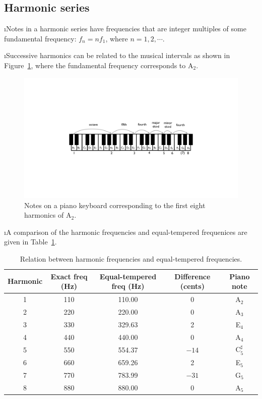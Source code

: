 \ei
\subsection{Harmonic series}
\bi

\i Notes in a harmonic series have frequencies that 
are integer multiples of some fundamental frequency:
$f_n= n f_1$, where $n=1,2,\cdots$.

\i Successive harmonics can be related to the musical 
intervals as shown in Figure~\ref{f:harmonics-keys},
where the fundamental frequency corresponds to A$_2$.
%
\begin{figure}[htbp]
\begin{center}
\includegraphics[width=\textwidth]{harmonics-keys}
\caption{Notes on a piano keyboard corresponding to
the first eight harmonics of A$_2$.}
\label{f:harmonics-keys}
\end{center}
\end{figure}
%

\i A comparison of the harmonic frequencies and
equal-tempered frequenices are given in 
Table~\ref{t:harmonics-ET}.
%
\begin{table}[htbp]
\begin{center}
\begin{tabular}{|c|c|c|c|c|}
\hline
Harmonic & Exact freq (Hz) & Equal-tempered freq (Hz) 
& Difference (cents) & Piano note \\ 
\hline
1 & 110 & 110.00 & 0 & A$_2$ \\
2 & 220 & 220.00 & 0 & A$_3$ \\
3 & 330 & 329.63 & 2 & E$_4$ \\
4 & 440 & 440.00 & 0 & A$_4$ \\
5 & 550 & 554.37 & $-14$ & C$_5^\sharp$ \\
6 & 660 & 659.26 & 2 & E$_5$ \\
7 & 770 & 783.99 & $-31$ & G$_5$ \\
8 & 880 & 880.00 & 0 & A$_5$ \\
\hline
\end{tabular}
\caption{Relation between harmonic frequencies
and equal-tempered frequencies.}
\label{t:harmonics-ET}
\end{center}
\end{table}

